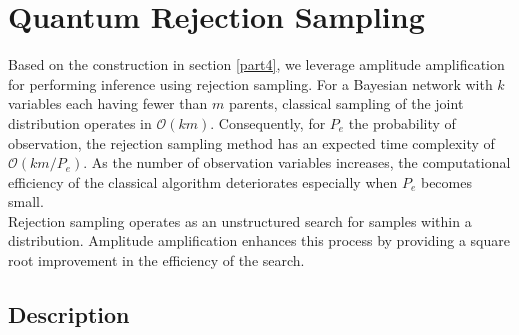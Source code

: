 \clearpage
\section{Quantum Rejection Sampling}

Based on the construction in section \ref{part4}, we leverage amplitude amplification for performing inference using rejection sampling. For a Bayesian network with $k$ variables each having fewer than $m$ parents, classical sampling of the joint distribution operates in $\mathcal{O}(km)$. Consequently, for $P_e$ the probability of observation, the rejection sampling method has an expected time complexity of $\mathcal{O}(km/P_e)$. As the number of observation variables increases, the computational efficiency of the classical algorithm deteriorates especially when $P_e$ becomes small.
\\[5pt]
Rejection sampling operates as an unstructured search for samples within a distribution. Amplitude amplification enhances this process by providing a square root improvement in the efficiency of the search. \cite{low2014quantum}

\subsection{Description}

